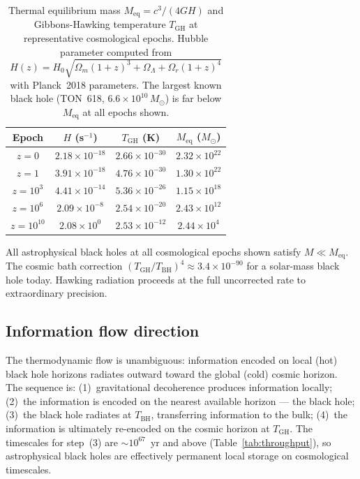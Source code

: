 \documentclass[12pt,a4paper]{article}
\begin{document}
\begin{table}[h]
\centering
\caption{Thermal equilibrium mass $M_\mathrm{eq} = c^3/(4GH)$ and Gibbons-Hawking
temperature $T_\mathrm{GH}$ at representative cosmological epochs. Hubble parameter
computed from $H(z) = H_0\sqrt{\Omega_m(1+z)^3 + \Omega_\Lambda + \Omega_r(1+z)^4}$
with Planck~2018 parameters. The largest known black hole (TON~618,
$6.6\times 10^{10}\,M_\odot$) is far below $M_\mathrm{eq}$ at all epochs shown.}
\label{tab:Meq}
\begin{tabular}{cccc}
\toprule
Epoch & $H$ (s$^{-1}$) & $T_\mathrm{GH}$ (K) & $M_\mathrm{eq}$ ($M_\odot$) \\
\midrule
$z = 0$         & $2.18 \times 10^{-18}$ & $2.66 \times 10^{-30}$ & $2.32 \times 10^{22}$ \\
$z = 1$         & $3.91 \times 10^{-18}$ & $4.76 \times 10^{-30}$ & $1.30 \times 10^{22}$ \\
$z = 10^{3}$    & $4.41 \times 10^{-14}$ & $5.36 \times 10^{-26}$ & $1.15 \times 10^{18}$ \\
$z = 10^{6}$    & $2.09 \times 10^{-8}$  & $2.54 \times 10^{-20}$ & $2.43 \times 10^{12}$ \\
$z = 10^{10}$   & $2.08 \times 10^{0}$   & $2.53 \times 10^{-12}$ & $2.44 \times 10^{4}$  \\
\bottomrule
\end{tabular}
\end{table}

All astrophysical black holes at all cosmological epochs shown satisfy
$M \ll M_\mathrm{eq}$. The cosmic bath correction
$(T_\mathrm{GH}/T_\mathrm{BH})^4 \approx 3.4\times 10^{-90}$ for a
solar-mass black hole today. Hawking radiation proceeds at the full
uncorrected rate to extraordinary precision.

\subsection{Information flow direction}

The thermodynamic flow is unambiguous: information encoded on local (hot) black
hole horizons radiates outward toward the global (cold) cosmic horizon. The
sequence is: (1)~gravitational decoherence produces information locally;
(2)~the information is encoded on the nearest available horizon --- the black hole;
(3)~the black hole radiates at $T_\mathrm{BH}$, transferring information to the
bulk; (4)~the information is ultimately re-encoded on the cosmic horizon at
$T_\mathrm{GH}$. The timescales for step~(3) are $\sim 10^{67}$~yr and above
(Table~\ref{tab:throughput}), so astrophysical black holes are effectively
permanent local storage on cosmological timescales.
\end{document}
